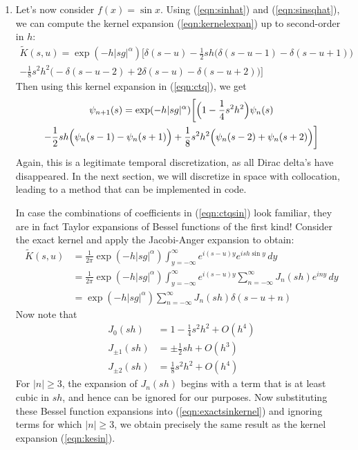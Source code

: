 \documentclass[11pt,letterpaper]{article}
\begin{document}
\begin{enumerate}
\item Let's now consider $f(x) = \sin x$.  Using (\ref{eqn:sinhat}) and (\ref{eqn:sinsqhat}), we can compute the kernel expansion  (\ref{eqn:kernelexpan}) up to second-order in $h$:
\begin{multline}
\label{eqn:kesin}
\widetilde{K}(s,u) = \exp(-h |s g|^{\alpha})  \biggl[ \delta(s-u) - \frac{1}{2} s h \bigl( \delta(s-u-1) - \delta(s-u+1) \bigr) \\ - \frac{1}{8} s^2 h^2 \bigl( -\delta(s-u-2) + 2 \delta(s-u) - \delta(s-u+2) \bigr) \biggr]
\end{multline}
Then using this kernel expansion in (\ref{eqn:ctq}), we get
\begin{multline}
\label{eqn:ctqsin}
\psi_{n+1}(s) = \exp(-h |s g|^{\alpha}) \biggl[
\Bigl( 1 - \frac{1}{4} s^2 h^2 \Bigr) \psi_n(s) \\
- \frac{1}{2} s h \Bigl( \psi_n(s-1) - \psi_n(s + 1) \Bigr)
+ \frac{1}{8} s^2 h^2 \Bigl( \psi_n(s-2) + \psi_n(s + 2) \Bigr) \biggr]
\end{multline}
Again, this is a legitimate temporal discretization, as all Dirac delta's have disappeared.  In the next section, we will discretize in space with collocation, leading to a method that can be implemented in code.

In case the combinations of coefficients in (\ref{eqn:ctqsin}) look familiar, they are in fact Taylor expansions of Bessel functions of the first kind!  Consider the exact kernel and apply the Jacobi-Anger expansion to obtain:
\begin{align}
\widetilde{K}(s,u) &= \frac{1}{2 \pi}  \exp(-h |s g|^{\alpha})  \int_{y=-\infty}^\infty e^{i(s-u)y} e^{i s h \sin y } \, dy \nonumber \\
 &= \frac{1}{2 \pi}  \exp(-h |s g|^{\alpha})  \int_{y=-\infty}^\infty e^{i(s-u)y} \sum_{n=-\infty}^\infty J_n(s h) e^{i n  y} \, dy \nonumber \\
 \label{eqn:exactsinkernel}
 &=  \exp(-h |s g|^{\alpha}) \sum_{n=-\infty}^\infty J_n(s h) \delta(s - u + n) 
\end{align}
Now note that
\begin{align*}
J_0 (sh) &= 1 - \frac{1}{4} s^2 h^2 + O(h^4) \\
J_{\pm 1} (sh) &= \pm \frac{1}{2} s h + O(h^3) \\
J_{\pm 2} (sh) &= \frac{1}{8} s^2 h^2 + O(h^4)
\end{align*}
For $|n| \geq 3$, the expansion of $J_{n}(s h)$ begins with a term that is at least cubic in $s h$, and hence can be ignored for our purposes.  Now substituting these Bessel function expansions into (\ref{eqn:exactsinkernel}) and ignoring terms for which $|n| \geq 3$, we obtain precisely the same result as the kernel expansion (\ref{eqn:kesin}).
\end{enumerate}
\end{document}
